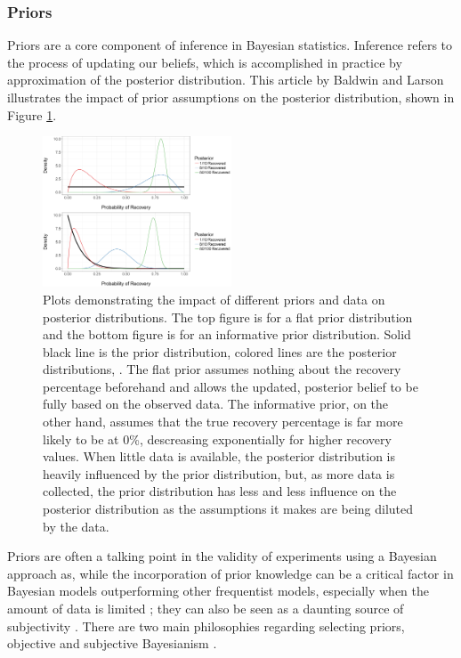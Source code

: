\subsubsection{Priors}
Priors are a core component of inference in Bayesian statistics. Inference
refers to the process of updating our beliefs, which is accomplished in
practice by approximation of the posterior distribution. This article
\cite{clinical} by Baldwin and Larson illustrates the
impact of prior assumptions on the posterior distribution, shown in Figure
\ref{fig:prior-impact}. 
\begin{figure}
  \begin{center}
    \includegraphics[width=0.5\textwidth]{../imgs/prior-impact.jpg}
  \end{center}
  \caption{Plots demonstrating the impact of different priors and data on posterior distributions. The top figure is for a flat prior distribution and the bottom figure is for an informative prior distribution. Solid black line is the prior distribution, colored lines are the posterior distributions, \cite{clinical}. The flat prior assumes nothing about the recovery percentage beforehand and allows the updated, posterior belief to be fully based on the observed data. The informative prior, on the other hand, assumes that the true recovery percentage is far more likely to be at 0\%, descreasing exponentially for higher recovery values. When little data is available, the posterior distribution is heavily influenced by the prior distribution, but, as more data is collected, the prior distribution has less and less influence on the posterior distribution as the assumptions it makes are being diluted by the data.}
  \label{fig:prior-impact}
\end{figure}
Priors are often a talking point in the validity of experiments using a
Bayesian approach as, while the incorporation of prior knowledge can be a critical
factor in Bayesian models outperforming other frequentist models, especially
when the amount of data is limited \cite{priorgood}; they can also be seen as a
daunting source of subjectivity \cite{clinical}. There are two main
philosophies regarding selecting priors, objective and subjective
Bayesianism \cite{obj-sub}. 

